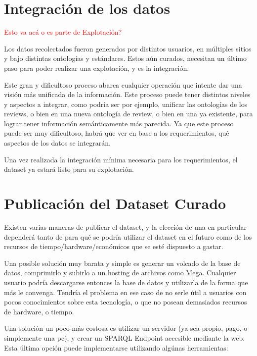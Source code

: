 %

\section{Integración de los datos}
\begin{framed}
\textcolor{red}{Esto va acá o es parte de Explotación?}
\end{framed}


Los datos recolectados fueron generados por distintos usuarios, en múltiples sitios y bajo distintas ontologías y estándares.
Estos aún curados, necesitan un último paso para poder realizar una explotación, y es la integración.

Este gran y dificultoso proceso abarca cualquier operación que intente dar una visión más unificada de la información. Este
proceso puede tener distintos niveles y aspectos a integrar, como podría ser por ejemplo, unificar las ontologías de los reviews, o bien
en una nueva ontología de review, o bien en una ya existente, para lograr tener información semánticamente más parecida. Ya 
que este proceso puede ser muy dificultoso, habrá que ver en base a los requerimientos, qué aspectos de los datos se integrarán.

Una vez realizada la integración mínima necesaria para los requerimientos, el dataset ya estará listo para su explotación.

\section{Publicación del Dataset Curado}

Existen varias maneras de publicar el dataset, y la elección de una en particular dependerá tanto de para qué se podría utilizar el dataset en el futuro como
de los recursos de tiempo/hardware/económicos que se esté dispuesto a gastar.

Una posible solución muy barata y simple es generar un volcado de la base de datos, comprimirlo y subirlo a un hosting de archivos como Mega. Cualquier usuario podría descargarse entonces la base de datos y utilizarla de la forma que más le convenga.
Tendría el problema en ese caso de no serle útil a usuarios con pocos conocimientos sobre esta tecnología, o que no posean demasiados recursos de hardware, o tiempo.

Una solución un poco más costosa es utilizar un servidor (ya sea propio, pago, o simplemente una pc), y crear un SPARQL Endpoint accesible mediante la web.
Esta última opción puede implementarse utilizando algúnas herramientas:


